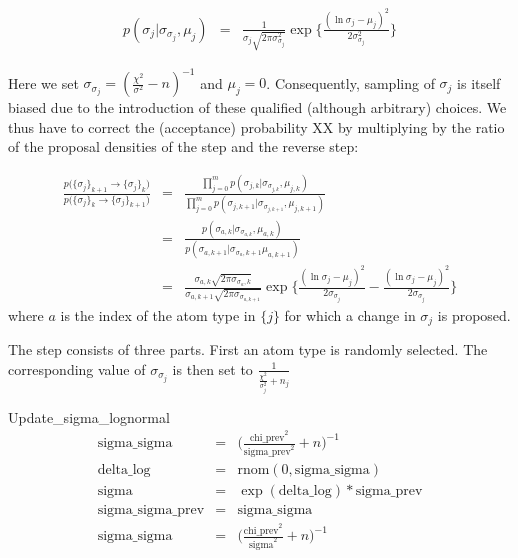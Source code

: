 \begin{eqnarray}
p(\sigma_j | \sigma_{\sigma_j}, \mu_j) &=& \frac{1}{\sigma_j\sqrt{2\pi \sigma_{\sigma_j}^2}} \exp{} \Biggl\{ \frac{(\ln{\sigma_j-\mu_j})^2}{2\sigma_{\sigma_j}^2} \Biggr\}
\end{eqnarray}

Here we set $\sigma_{\sigma_j} = \left( \frac{\chi^2}{\sigma^2}-n\right)^{-1}$ and $\mu_j = 0$. Consequently, sampling of $\sigma_j$ is itself biased due to the introduction of these qualified (although arbitrary) choices. We thus have to correct the (acceptance) probability XX by multiplying by the ratio of the proposal densities of the step and the reverse step:

\begin{eqnarray}
\frac{p\Big( \{\sigma_j\}_{k+1} \rightarrow \{\sigma_j\}_k\Big)}{p\Big( \{\sigma_j\}_k \rightarrow \{\sigma_j\}_{k+1} \Big)} & = & \frac{\prod_{j=0}^{m}p(\sigma_{j,k} | \sigma_{\sigma_{j,k}}, \mu_{j,k}) }{\prod_{j=0}^{m}p(\sigma_{j,k+1} | \sigma_{\sigma_{j,k+1}}, \mu_{j,k+1})}\\
& = & \frac{p(\sigma_{a,k} | \sigma_{\sigma_{a,k}}, \mu_{a,k}) }{p(\sigma_{a,k+1} | \sigma_{\sigma_{a},k+1} \mu_{a,k+1})}\\
&=& \frac{\sigma_{a,k}\sqrt{2\pi \sigma_{\sigma_{a},k}}}{\sigma_{a,k+1}\sqrt{2\pi \sigma_{\sigma_{a,k+1}}}} \exp{} \Biggl\{ \frac{(\ln{\sigma_j-\mu_j})^2}{2\sigma_{\sigma_j}} - \frac{(\ln{\sigma_j-\mu_j})^2}{2\sigma_{\sigma_j}} \Biggr\}
\end{eqnarray}
where $a$ is the index of the atom type in $\{j\}$ for which a change in $\sigma_j$ is proposed.






The step consists of three parts. First an atom type is randomly selected. The corresponding value of $\sigma_{\sigma_j}$ is then set to $\frac{1}{\frac{\chi^2}{\sigma_j^2}+n_j}$



Update\_sigma\_lognormal
\begin{eqnarray}
\mathrm{sigma\_sigma} & = &\Bigg(\frac{\mathrm{chi\_prev}^2}{\mathrm{sigma\_prev}^2}+n \Bigg)^{-1}\\
\mathrm{delta\_log} & = & \mathrm{rnom}\left(0, \mathrm{sigma\_sigma}\right)\\
\mathrm{sigma} & = & \exp{}\left( \mathrm{delta\_log} \right) * \mathrm{sigma\_prev}\\
\mathrm{sigma\_sigma\_prev} & = & \mathrm{sigma\_sigma} \\
\mathrm{sigma\_sigma} & = &\Bigg(\frac{\mathrm{chi\_prev}^2}{\mathrm{sigma}^2}+n \Bigg)^{-1}
\end{eqnarray}

